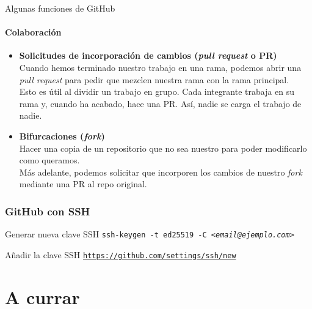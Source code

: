 \documentclass[11pt]{beamer}
\begin{document}

\begin{frame}{Algunas funciones de GitHub}
    \framesubtitle{Colaboración}
	\begin{itemize}
	    \item \textbf{Solicitudes de incorporación de cambios (\textit{pull request} o PR)} \\ Cuando hemos terminado nuestro trabajo en una rama, podemos abrir una \textit{pull request} para pedir que mezclen nuestra rama con la rama principal. \\
        \footnotesize Esto es útil al dividir un trabajo en grupo. Cada integrante trabaja en su rama y, cuando ha acabado, hace una PR. Así, nadie se carga el trabajo de nadie.\normalsize
        \item \textbf{Bifurcaciones (\textit{fork})} \\ Hacer una copia de un repositorio que no sea nuestro para poder modificarlo como queramos.\\
        \footnotesize Más adelante, podemos solicitar que incorporen los cambios de nuestro \textit{fork} mediante una PR al repo original.
	\end{itemize}
\end{frame}


\begin{frame} %
	\frametitle{GitHub con SSH}
	
	\begin{block}{Generar nueva clave SSH}
		\texttt{ssh-keygen -t ed25519 -C \textit{<email@ejemplo.com>}}
	\end{block}

    \begin{block}{Añadir la clave SSH}
        \href{https://github.com/settings/ssh/new}{\texttt{https://github.com/settings/ssh/new}}
    \end{block}

\end{frame}

\section{A currar}
\end{document}
